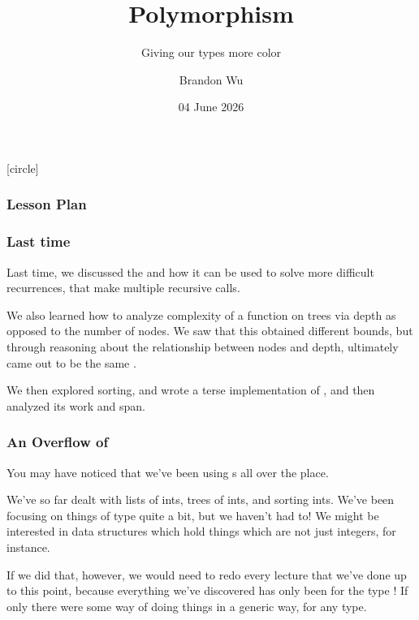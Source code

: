 \documentclass[aspectratio=169]{beamer}
\title{Polymorphism} %
\subtitle{Giving our types more color} %
\date{04 June 2026} %
\author{Brandon Wu} %
\newif\ifcolorlambda
\begin{document}
\ifweb
    \renewcommand{\pause}{}
\fi

[circle]

{
\begin{frame}[plain]
    \colorlambdatrue
    \titlepage
\end{frame}
}


\begin{frame}[fragile]
  \frametitle{Lesson Plan}

  \tableofcontents
\end{frame}

\begin{frame}[fragile]
  \frametitle{Last time}

  Last time, we discussed the  and how it can be used to
  solve more difficult recurrences, that make multiple recursive calls.

  \pause
  \vspace{\fill}

  We also learned how to analyze complexity of a function on trees via
  depth as opposed to the number of nodes. We saw that this obtained
  different bounds, but through reasoning about the relationship between
  nodes and depth, ultimately came out to be the same .

  \pause
  \vspace{\fill}

  We then explored sorting, and wrote a terse implementation of ,
  and then analyzed its work and span.
\end{frame}


\begin{frame}[fragile]
  \frametitle{An Overflow of }

  You may have noticed that we've been using s all over the place.

  \pause
  \vspace{\fill}

  We've so far dealt with lists of ints, trees of ints, and sorting ints. We've
  been focusing on things of type  quite a bit, but we haven't had to!
  We might be interested in data structures which hold things which are not
  just integers, for instance.

  \pause
  \vspace{\fill}

  If we did that, however, we would need to redo every lecture that we've done
  up to this point, because everything we've discovered has only been for the type
  ! If only there were some way of doing things in a generic way, for
  any type.
\end{frame}
\end{document}
